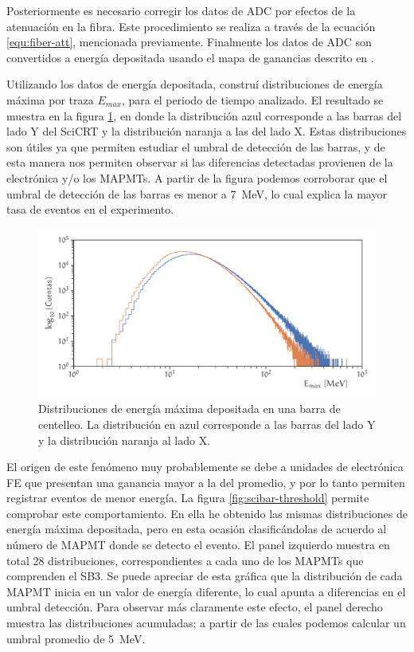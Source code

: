 Posteriormente es necesario corregir los datos de ADC por efectos de la atenuación en la fibra. Este procedimiento se realiza a través de la ecuación \ref{equ:fiber-att}, mencionada previamente. Finalmente los datos de ADC son convertidos a energía depositada usando el mapa de ganancias descrito en \cite{hikimochi16}.

Utilizando los datos de energía depositada, construí distribuciones de energía máxima por traza $E_{max}$, para el periodo de tiempo analizado. El resultado se muestra en la figura \ref{fig:neutron-mindep}, en donde la distribución azul corresponde a las barras del lado Y del SciCRT y la distribución naranja a las del lado X. Estas distribuciones son útiles ya que permiten estudiar el umbral de detección de las barras, y de esta manera nos permiten observar si las diferencias detectadas provienen de la electrónica y/o los MAPMTs. A partir de la figura podemos corroborar que el umbral de detección de las barras es menor a \SI{7}{\mega\electronvolt}, lo cual explica la mayor tasa de eventos en el experimento.

\begin{figure}
        \centering
        \includegraphics[width=\textwidth]{neutron-mindep.pdf}
        \caption{Distribuciones de energía máxima depositada en una barra de centelleo. La distribución en azul corresponde a las barras del lado Y y la distribución naranja al lado X.}
        \label{fig:neutron-mindep}
\end{figure}

El origen de este fenómeno muy probablemente se debe a unidades de electrónica FE que presentan una ganancia mayor a la del promedio, y por lo tanto permiten registrar eventos de menor energía. La figura \ref{fig:scibar-threshold} permite comprobar este comportamiento. En ella he obtenido las mismas distribuciones de energía máxima depositada, pero en esta ocasión clasificándolas de acuerdo al número de MAPMT donde se detecto el evento. El panel izquierdo muestra en total \num{28} distribuciones, correspondientes a cada uno de los MAPMTs que comprenden el SB3. Se puede apreciar de esta gráfica que la distribución de cada MAPMT inicia en un valor de energía diferente, lo cual apunta a diferencias en el umbral detección. Para observar más claramente este efecto, el panel derecho muestra las distribuciones acumuladas; a partir de las cuales podemos calcular un umbral promedio de \SI{5}{\mega\electronvolt}.

